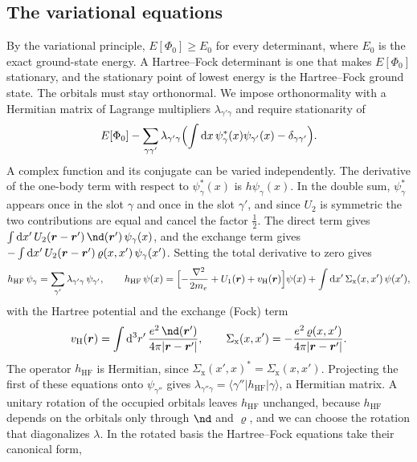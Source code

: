 \subsection{The variational equations}

By the variational principle, $E[\Phi_0] \ge E_0$ for every determinant, where $E_0$ is the exact ground-state energy. A Hartree--Fock determinant is one that makes $E[\Phi_0]$ stationary, and the stationary point of lowest energy is the Hartree--Fock ground state. The orbitals must stay orthonormal. We impose orthonormality with a Hermitian matrix of Lagrange multipliers $\lambda_{\gamma'\gamma}$ and require stationarity of
\begin{equation*}
  E[\Phi_0] - \sum_{\gamma\gamma'}\lambda_{\gamma'\gamma}\Bigl(\int\mathrm{d} x\,\psi^*_\gamma(x)\psi_{\gamma'}(x) - \delta_{\gamma\gamma'}\Bigr) .
\end{equation*}
A complex function and its conjugate can be varied independently. The derivative of the one-body term with respect to $\psi^*_\gamma(x)$ is $h\psi_\gamma(x)$. In the double sum, $\psi^*_\gamma$ appears once in the slot $\gamma$ and once in the slot $\gamma'$, and since $U_2$ is symmetric the two contributions are equal and cancel the factor $\tfrac12$. The direct term gives $\int\dd x'\,U_2(\vect{r} - \vect{r}')\,\nd(\vect{r}')\,\psi_\gamma(x)$, and the exchange term gives $-\int\mathrm{d} x'\,U_2(\bm{r} - \bm{r}')\,\varrho(x, x')\,\psi_\gamma(x')$. Setting the total derivative to zero gives
\begin{equation*}
  h_{\mathrm{HF}}\,\psi_\gamma = \sum_{\gamma'}\lambda_{\gamma'\gamma}\,\psi_{\gamma'} , \qquad
  h_{\mathrm{HF}}\,\psi(x) = \Bigl[-\frac{\nabla^2}{2m_e} + U_1(\bm{r}) + v_{\mathrm{H}}(\bm{r})\Bigr]\psi(x) + \int\mathrm{d} x'\,\Sigma_{\mathrm{x}}(x, x')\,\psi(x') ,
\end{equation*}
with the Hartree potential and the exchange (Fock) term
\begin{equation*}
  v_{\mathrm{H}}(\vect{r}) = \int\dd^3r'\,\frac{e^2\,\nd(\vect{r}')}{4\pi|\vect{r} - \vect{r}'|}, \qquad
  \Sigma_{\mathrm{x}}(x, x') = -\frac{e^2\,\varrho(x, x')}{4\pi|\vect{r} - \vect{r}'|} .
\end{equation*}
The operator $h_{\mathrm{HF}}$ is Hermitian, since $\Sigma_{\mathrm{x}}(x', x)^* = \Sigma_{\mathrm{x}}(x, x')$. Projecting the first of these equations onto $\psi_{\gamma''}$ gives $\lambda_{\gamma''\gamma} = \langle\gamma''|h_{\mathrm{HF}}|\gamma\rangle$, a Hermitian matrix. A unitary rotation of the occupied orbitals leaves $h_{\mathrm{HF}}$ unchanged, because $h_{\mathrm{HF}}$ depends on the orbitals only through $\nd$ and $\varrho$, and we can choose the rotation that diagonalizes $\lambda$. In the rotated basis the Hartree--Fock equations take their canonical form,
